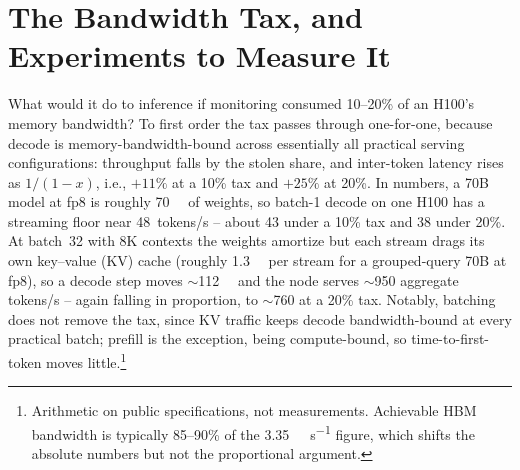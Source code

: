 \section{The Bandwidth Tax, and Experiments to Measure It}
\label{sec:BandwidthTax}


What would it do to inference if monitoring consumed 10--20\% of an
H100's memory bandwidth? To first order the tax passes through
one-for-one, because decode is memory-bandwidth-bound across
essentially all practical serving configurations: throughput falls by
the stolen share, and inter-token latency rises as $1/(1-x)$, i.e.,
$+11\%$ at a 10\% tax and $+25\%$ at 20\%. In numbers, a 70B model at
fp8 is roughly \qty{70}{\giga\byte} of weights, so batch-1 decode on
one H100 has a streaming floor near 48~tokens/s -- about 43 under a
10\% tax and 38 under 20\%. At batch~32 with 8K contexts the weights
amortize but each stream drags its own key--value (KV) cache (roughly
\qty{1.3}{\giga\byte} per stream for a grouped-query 70B at fp8), so a
decode step moves $\sim$\qty{112}{\giga\byte} and the node serves
$\sim$950 aggregate tokens/s -- again falling in proportion, to
$\sim$760 at a 20\% tax. Notably, batching does not remove the tax,
since KV traffic keeps decode bandwidth-bound at every practical batch;
prefill is the exception, being compute-bound, so time-to-first-token
moves little.\footnote{Arithmetic on public specifications, not
measurements. Achievable HBM bandwidth is typically 85--90\% of the
\qty{3.35}{\tera\byte\per\second} figure, which shifts the absolute
numbers but not the proportional argument.}

